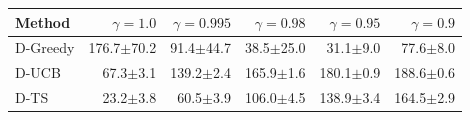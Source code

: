 \begin{tabular}{lrrrrr}
\toprule
Method & $\gamma=1.0$ & $\gamma=0.995$ & $\gamma=0.98$ & $\gamma=0.95$ & $\gamma=0.9$ \\
\midrule
D-Greedy & 176.7{\scriptsize$\pm$70.2} & 91.4{\scriptsize$\pm$44.7} & 38.5{\scriptsize$\pm$25.0} & 31.1{\scriptsize$\pm$9.0} & 77.6{\scriptsize$\pm$8.0} \\
D-UCB & 67.3{\scriptsize$\pm$3.1} & 139.2{\scriptsize$\pm$2.4} & 165.9{\scriptsize$\pm$1.6} & 180.1{\scriptsize$\pm$0.9} & 188.6{\scriptsize$\pm$0.6} \\
D-TS & 23.2{\scriptsize$\pm$3.8} & 60.5{\scriptsize$\pm$3.9} & 106.0{\scriptsize$\pm$4.5} & 138.9{\scriptsize$\pm$3.4} & 164.5{\scriptsize$\pm$2.9} \\
\bottomrule
\end{tabular}
